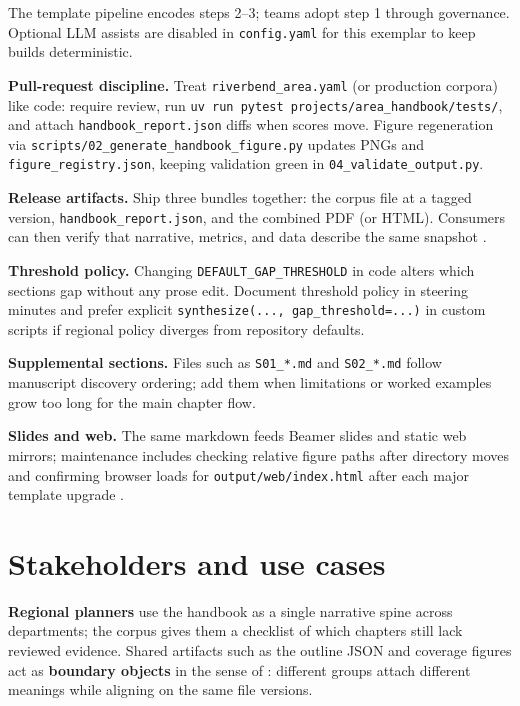 \documentclass[
]{article}
\begin{document}
The template pipeline encodes steps 2--3; teams adopt step 1 through
governance. Optional LLM assists are disabled in \texttt{config.yaml}
for this exemplar to keep builds deterministic.

\textbf{Pull-request discipline.} Treat \texttt{riverbend\_area.yaml}
(or production corpora) like code: require review, run
\texttt{uv\ run\ pytest\ projects/area\_handbook/tests/}, and attach
\texttt{handbook\_report.json} diffs when scores move. Figure
regeneration via \texttt{scripts/02\_generate\_handbook\_figure.py}
updates PNGs and \texttt{figure\_registry.json}, keeping validation
green in \texttt{04\_validate\_output.py}.

\textbf{Release artifacts.} Ship three bundles together: the corpus file
at a tagged version, \texttt{handbook\_report.json}, and the combined
PDF (or HTML). Consumers can then verify that narrative, metrics, and
data describe the same snapshot \citep{gray2005}.

\textbf{Threshold policy.} Changing \texttt{DEFAULT\_GAP\_THRESHOLD} in
code alters which sections gap without any prose edit. Document
threshold policy in steering minutes and prefer explicit
\texttt{synthesize(...,\ gap\_threshold=...)} in custom scripts if
regional policy diverges from repository defaults.

\textbf{Supplemental sections.} Files such as \texttt{S01\_*.md} and
\texttt{S02\_*.md} follow manuscript discovery ordering; add them when
limitations or worked examples grow too long for the main chapter flow.

\textbf{Slides and web.} The same markdown feeds Beamer slides and
static web mirrors; maintenance includes checking relative figure paths
after directory moves and confirming browser loads for
\texttt{output/web/index.html} after each major template upgrade
\citep{template2026}.

\newpage

\section{Stakeholders and use cases}\label{stakeholders-and-use-cases}

\textbf{Regional planners} use the handbook as a single narrative spine
across departments; the corpus gives them a checklist of which chapters
still lack reviewed evidence. Shared artifacts such as the outline JSON
and coverage figures act as \textbf{boundary objects} in the sense of
\citet{star1989}: different groups attach different meanings while
aligning on the same file versions.
\end{document}
